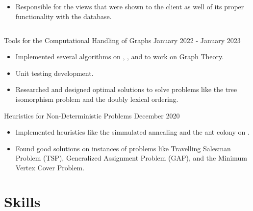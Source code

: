 \documentclass{resume}
\begin{document}
\begin{paracol}{2}
{\begin{itemize}
              \item Responsible for the views that were shown to the client as
                well of its proper functionality with the database.
            \end{itemize}
          }

      \subsection{\large{}}

      \project%
          {Tools for the Computational Handling of Graphs}
          {January 2022 - January 2023}
          {
            \begin{itemize}
              \item 
                Implemented several algorithms on , , and
                 to work on Graph Theory.

              \item 
                Unit testing development.

              \item 
                Researched and designed optimal solutions to solve problems like
                the tree isomorphism problem and the doubly lexical ordering.
            \end{itemize}
          }
          
      \project%
          {Heuristics for Non-Deterministic Problems}
          {December 2020}
          {
            \begin{itemize}
              \item
                Implemented heuristics like the simmulated annealing and the ant
                colony on .

              \item Found good solutions on instances of problems like
                Travelling Salesman Problem (TSP), Generalized Assignment
                Problem (GAP), and the Minimum Vertex Cover Problem.
            \end{itemize}
          }

    \switchcolumn
      
    \section{Skills}
    
      \subsection{}


\end{paracol}
\end{document}
